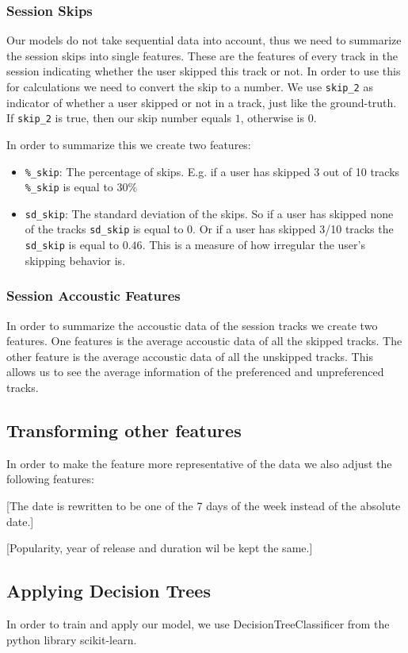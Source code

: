 \documentclass[conference]{IEEEtran}
\begin{document}
\subsubsection{Session Skips}
Our models do not take sequential data into account, 
thus we need to summarize the session skips into single features. 
These are the features of every track in the session indicating whether the user skipped this track or not.
In order to use this for calculations we need to convert the skip to a number. 
We use \verb|skip_2| as indicator of whether a user skipped or not in a track, 
just like the ground-truth. 
If \verb|skip_2| is true, then our skip number equals $1$, 
otherwise is $0$.

In order to summarize this we create two features:
\begin{itemize}
	\item \verb|%_skip|: The percentage of skips. 
		E.g. if a user has skipped 3 out of 10 tracks \verb|%_skip| is equal to $30\%$
	\item \verb|sd_skip|: The standard deviation of the skips. 
	So if a user has skipped none of the tracks \verb|sd_skip| is equal to 0. 
	Or if a user has skipped 3/10 tracks the \verb|sd_skip| is equal to $0.46$.
	This is a measure of how irregular the user's skipping behavior is.
\end{itemize}


\subsubsection{Session Accoustic Features}
In order to summarize the accoustic data of the session tracks we create two features. 
One features is the average accoustic data of all the skipped tracks. 
The other feature is the average accoustic data of all the unskipped tracks.
This allows us to see the average information of the preferenced and unpreferenced tracks.

\subsection{Transforming other features}
In order to make the feature more representative of the data we also adjust the following features:

[The date is rewritten to be one of the 7 days of the week instead of the absolute date.]

[Popularity, year of release and duration wil be kept the same.]

\subsection{Applying Decision Trees}
In order to train and apply our model, we use DecisionTreeClassificer from 
the python library scikit-learn.
\end{document}

